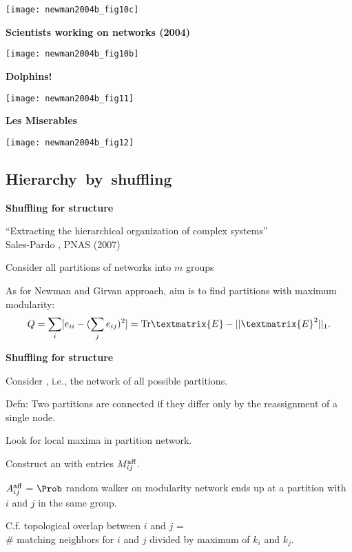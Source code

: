   \texttt{[image: newman2004b\_fig10c]}


  \textbf{Scientists working on networks (2004)}

  \texttt{[image: newman2004b\_fig10b]}



  \textbf{Dolphins!}

  \texttt{[image: newman2004b\_fig11]}



  \textbf{Les Miserables}

  \texttt{[image: newman2004b\_fig12]}



\subsection{Hierarchy\ by\ shuffling}

  \textbf{Shuffling for structure}

  
   
    ``Extracting the hierarchical organization 
    of complex systems''\\
    Sales-Pardo \etal, PNAS (2007)\cite{sales-pardo2007a,sales-pardo2007b}
  
    Consider all partitions of networks into $m$ groups
      
    As for Newman and Girvan approach, aim is to find
    partitions with maximum modularity:
    $$
    Q = 
    \sum_{i}
    [e_{ii} - (\sum_j e_{ij})^2]
    =
    {\textnormal{Tr}} \textmatrix{E} - || \textmatrix{E}^2 ||_1.
    $$
    

  \textbf{Shuffling for structure}

  
  
    Consider , i.e., 
    the network of all possible partitions.
  
    \alert{Defn:} Two partitions are connected if
    they differ only by the 
    reassignment of a single node.
  
    Look for local maxima in partition network.
  
    Construct an  with entries $M_{ij}^{\textnormal{aff}}$.
  
    $A_{ij}^{\textnormal{aff}}$ = $\Prob$ random walker on modularity network
    ends up at a partition with $i$ and $j$ in the same group.
  
    C.f. \alert{topological overlap} between $i$ and $j$ = \\
    \# matching neighbors for $i$ and $j$ divided by 
    maximum of $k_i$ and $k_j$.
  


